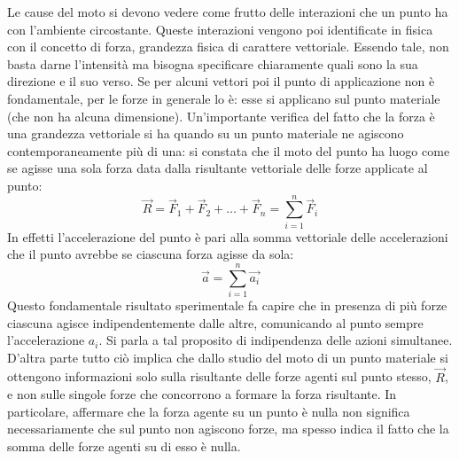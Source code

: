 \documentclass[10pt,a4paper]{book}
\begin{document}
Le cause del moto si devono vedere come frutto delle interazioni che un punto ha con l'ambiente circostante. Queste interazioni vengono poi identificate in fisica con il concetto di forza, grandezza fisica di carattere vettoriale. Essendo tale, non basta darne l'intensità ma bisogna specificare chiaramente quali sono la sua direzione e il suo verso.  Se per alcuni vettori poi il punto di applicazione non è fondamentale,  per le forze in generale lo è: esse si applicano sul punto materiale (che non ha alcuna dimensione).
Un'importante verifica del fatto che la forza è una grandezza vettoriale si ha quando su un punto materiale ne agiscono contemporaneamente più di una: si constata che il moto del punto ha luogo come se agisse una sola forza data dalla risultante vettoriale delle forze applicate al punto:
\[
	\vec{R}=\vec{F}_1+\vec{F}_2+\dots+\vec{F}_n=\sum_{i=1}^n \vec{F}_i
\]
In effetti l'accelerazione del punto è pari alla somma vettoriale delle accelerazioni che il punto avrebbe se ciascuna forza agisse da sola:
\[
	\vec{a}=\sum_{i=1}^n \vec{a_i}
\]
Questo fondamentale risultato sperimentale fa capire che in presenza di più forze ciascuna agisce indipendentemente dalle altre, comunicando al punto sempre l'accelerazione $a_i$. Si parla a tal proposito di indipendenza delle azioni simultanee. D'altra parte tutto ciò implica che dallo studio del moto di un punto materiale si ottengono informazioni solo sulla risultante delle forze agenti sul punto stesso, $\vec{R}$, e non sulle singole forze che concorrono a formare la forza risultante. In particolare, affermare che la forza agente su un punto è nulla non significa necessariamente che sul punto non agiscono forze, ma spesso indica il fatto che la somma delle forze agenti su di esso è nulla.
\end{document}
